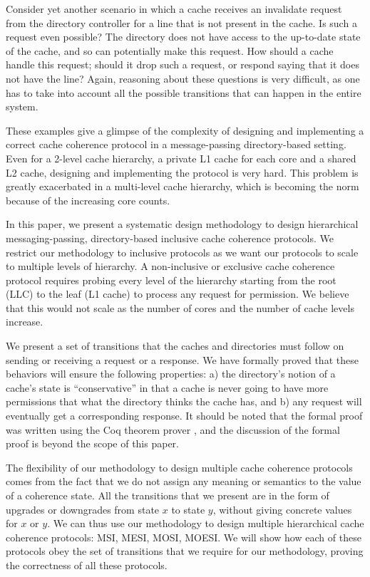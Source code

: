 Consider yet another scenario in which a cache receives an invalidate request
from the directory controller for a line that is not present in the cache. Is
such a request even possible? The directory does not have access to the
up-to-date state of the cache, and so can potentially make this request. How
should a cache handle this request; should it drop such a request, or respond
saying that it does not have the line? Again, reasoning about these questions is
very difficult, as one has to take into account all the possible transitions
that can happen in the entire system.

These examples give a glimpse of the complexity of designing and implementing a
correct cache coherence protocol in a message-passing directory-based setting.
Even for a 2-level cache hierarchy, a private L1 cache for each core and a
shared L2 cache, designing and implementing the protocol is very hard. This
problem is greatly exacerbated in a multi-level cache hierarchy, which is
becoming the norm because of the increasing core counts.

In this paper, we present a systematic design methodology to design hierarchical
messaging-passing, directory-based inclusive cache coherence protocols. We
restrict our methodology to inclusive protocols as we want our protocols to
scale to multiple levels of hierarchy. A non-inclusive or exclusive cache
coherence protocol requires probing every level of the hierarchy starting from
the root (LLC) to the leaf (L1 cache) to process any request for permission. We
believe that this would not scale as the number of cores and the number of
cache levels increase.

We present a set of transitions that the caches and directories must follow on
sending or receiving a request or a response. We have formally proved that
these behaviors will ensure the following properties: a) the directory's notion
of a cache's state is ``conservative'' in that a cache is never going to have
more permissions that what the directory thinks the cache has, and b) any
request will eventually get a corresponding response. It should be noted that
the formal proof was written using the Coq theorem prover \cite{}, and the
discussion of the formal proof is beyond the scope of this paper.

The flexibility of our methodology to design multiple cache coherence protocols
comes from the fact that we do not assign any meaning or semantics to the value
of a coherence state. All the transitions that we present are in the form of
upgrades or downgrades from state $x$ to state $y$, without giving concrete
values for $x$ or $y$. We can thus use our methodology to design multiple
hierarchical cache coherence protocols: MSI, MESI, MOSI, MOESI. We will show
how each of these protocols obey the set of transitions that we require for our
methodology, proving the correctness of all these protocols.

